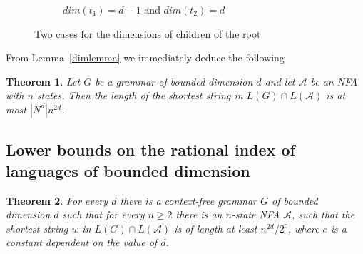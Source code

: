 \documentclass[11pt,a4paper]{article} %
\newtheorem{theorem}{Theorem}
\begin{document}
\begin{figure}[t]
\begin{subfigure}{.5\textwidth}
\begin{minipage}[m]{0.65\linewidth}
  \end{minipage}\hfill
  \caption{$dim(t_1) = d-1$ and $dim(t_2) = d$}
  \label{dimupper:2}
\end{subfigure}
\caption{Two cases for the dimensions of children of the root}
\label{dimupper}
\end{figure}

From Lemma~\ref{dimlemma} we immediately deduce the following
\begin{theorem}
\label{oscbnddim}
Let $G $ be a grammar of bounded dimension $d$ and let $\mathcal{A}$ be an NFA with $n$ states. Then the length of the shortest string in $L(G) \cap L(\mathcal{A})$ is at most $|N^d|n^{2d}$.
\end{theorem}

\label{sec:osc_lower}
\subsection{Lower bounds on the rational index of languages of bounded dimension}
\begin{theorem} For every $d$ there is a context-free grammar $G$ of bounded dimension $d$ such that for every $n \ge 2$ there is an $n$-state NFA $\mathcal{A}$, such that the shortest string $w$ in $L(G) \cap L(\mathcal{A})$ is of length at least $n^{2d}/2^c$, where $c$ is a constant dependent on the value of $d$.
\end{theorem}
\end{document}
